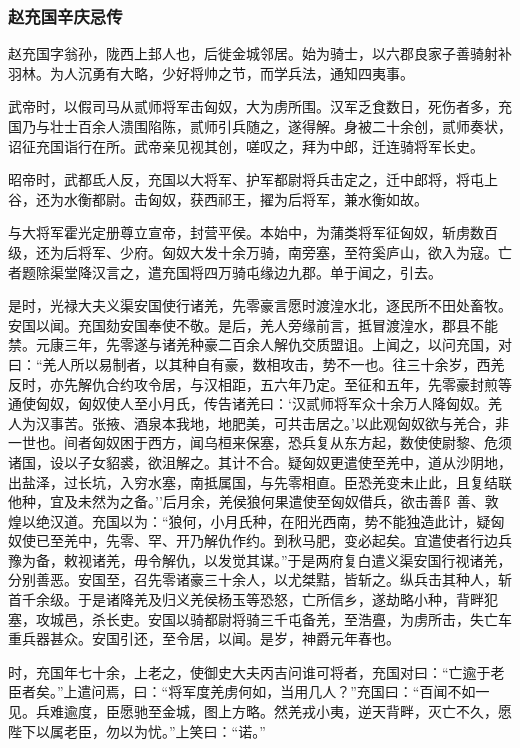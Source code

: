 \documentclass[]{article}
\begin{document}
\hypertarget{header-n5080}{%
\subsubsection{赵充国辛庆忌传}\label{header-n5080}}

赵充国字翁孙，陇西上邽人也，后徙金城邻居。始为骑士，以六郡良家子善骑射补羽林。为人沉勇有大略，少好将帅之节，而学兵法，通知四夷事。

武帝时，以假司马从贰师将军击匈奴，大为虏所围。汉军乏食数日，死伤者多，充国乃与壮士百余人溃围陷陈，贰师引兵随之，遂得解。身被二十余创，贰师奏状，诏征充国诣行在所。武帝亲见视其创，嗟叹之，拜为中郎，迁连骑将军长史。

昭帝时，武都氐人反，充国以大将军、护军都尉将兵击定之，迁中郎将，将屯上谷，还为水衡都尉。击匈奴，获西祁王，擢为后将军，兼水衡如故。

与大将军霍光定册尊立宣帝，封营平侯。本始中，为蒲类将军征匈奴，斩虏数百级，还为后将军、少府。匈奴大发十余万骑，南旁塞，至符奚庐山，欲入为寇。亡者题除渠堂降汉言之，遣充国将四万骑屯缘边九郡。单于闻之，引去。

是时，光禄大夫义渠安国使行诸羌，先零豪言愿时渡湟水北，逐民所不田处畜牧。安国以闻。充国劾安国奉使不敬。是后，羌人旁缘前言，抵冒渡湟水，郡县不能禁。元康三年，先零遂与诸羌种豪二百余人解仇交质盟诅。上闻之，以问充国，对曰：``羌人所以易制者，以其种自有豪，数相攻击，势不一也。往三十余岁，西羌反时，亦先解仇合约攻令居，与汉相距，五六年乃定。至征和五年，先零豪封煎等通使匈奴，匈奴使人至小月氏，传告诸羌曰：`汉贰师将军众十余万人降匈奴。羌人为汉事苦。张掖、酒泉本我地，地肥美，可共击居之。'以此观匈奴欲与羌合，非一世也。间者匈奴困于西方，闻乌桓来保塞，恐兵复从东方起，数使使尉黎、危须诸国，设以子女貂裘，欲沮解之。其计不合。疑匈奴更遣使至羌中，道从沙阴地，出盐泽，过长坑，入穷水塞，南抵属国，与先零相直。臣恐羌变未止此，且复结联他种，宜及未然为之备。''后月余，羌侯狼何果遣使至匈奴借兵，欲击善阝善、敦煌以绝汉道。充国以为：``狼何，小月氏种，在阳光西南，势不能独造此计，疑匈奴使已至羌中，先零、罕、开乃解仇作约。到秋马肥，变必起矣。宜遣使者行边兵豫为备，敕视诸羌，毋令解仇，以发觉其谋。''于是两府复白遣义渠安国行视诸羌，分别善恶。安国至，召先零诸豪三十余人，以尤桀黠，皆斩之。纵兵击其种人，斩首千余级。于是诸降羌及归义羌侯杨玉等恐怒，亡所信乡，遂劫略小种，背畔犯塞，攻城邑，杀长吏。安国以骑都尉将骑三千屯备羌，至浩亹，为虏所击，失亡车重兵器甚众。安国引还，至令居，以闻。是岁，神爵元年春也。

时，充国年七十余，上老之，使御史大夫丙吉问谁可将者，充国对曰：``亡逾于老臣者矣。''上遣问焉，曰：``将军度羌虏何如，当用几人？''充国曰：``百闻不如一见。兵难逾度，臣愿驰至金城，图上方略。然羌戎小夷，逆天背畔，灭亡不久，愿陛下以属老臣，勿以为忧。''上笑曰：``诺。''
\end{document}
